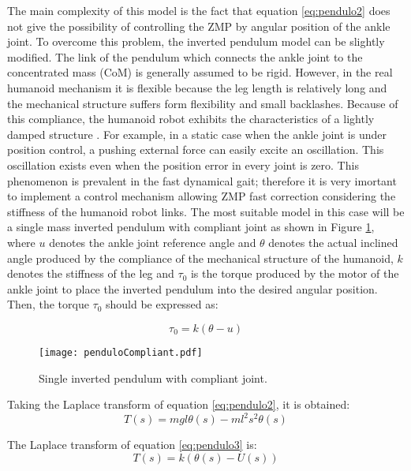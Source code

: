 The main complexity of this model is the fact that equation \eqref{eq:pendulo2} does not give the possibility of controlling the ZMP by angular position of the ankle joint. To overcome this problem, the inverted pendulum model can be slightly modified. The link of the pendulum which connects the ankle joint to the concentrated mass (CoM) is generally assumed to be rigid. However, in the real humanoid mechanism it is flexible because the leg length is relatively long and the mechanical structure suffers form flexibility and small backlashes. Because of this compliance, the humanoid robot exhibits the characteristics of a lightly damped structure \cite{Kim2004}. For example, in a static case when the ankle joint is under position control, a pushing external force can easily excite an oscillation. This oscillation exists even when the position error in every joint is zero. This phenomenon is prevalent in the fast dynamical gait; therefore it is very imortant to implement a control mechanism allowing ZMP fast correction considering the stiffness of the humanoid robot links. The most suitable model in this case will be a single mass inverted pendulum with compliant joint as shown in Figure \ref{fig:pendulo_elast}, where $u$ denotes the ankle joint reference angle and $\theta$ denotes the actual inclined angle produced by the compliance of the mechanical structure of the humanoid, $k$ denotes the stiffness of the leg and $\tau_0$ is the torque produced by the motor of the ankle joint to place the inverted pendulum into the desired angular position. Then, the torque $\tau_0$ should be expressed as:

\begin{equation}
\tau_0 = k(\theta - u)
\label{eq:pendulo3}
\end{equation}

\begin{figure}
\centering
\texttt{[image: penduloCompliant.pdf]}
\caption{Single inverted pendulum with compliant joint.}
\label{fig:pendulo_elast}
\end{figure}

Taking the Laplace transform of equation \ref{eq:pendulo2}, it is obtained: 
\begin{equation}
T(s) = mgl\theta(s)- ml^2s^2\theta(s) 
\label{eq:par}
\end{equation}

The Laplace transform of equation \eqref{eq:pendulo3} is:
\begin{equation}
T(s) = k(\theta(s) - U(s))
\label{eq:par2}
\end{equation}

